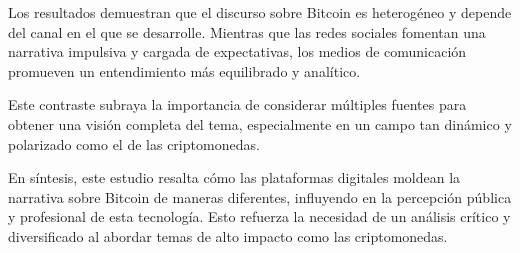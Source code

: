 \documentclass[journal]{IEEEtran}
\begin{document}
Los resultados demuestran que el discurso sobre Bitcoin es heterogéneo y depende del canal en el que se desarrolle. Mientras que las redes sociales fomentan una narrativa impulsiva y cargada de expectativas, los medios de comunicación promueven un entendimiento más equilibrado y analítico.

Este contraste subraya la importancia de considerar múltiples fuentes para obtener una visión completa del tema, especialmente en un campo tan dinámico y polarizado como el de las criptomonedas.

En síntesis, este estudio resalta cómo las plataformas digitales moldean la narrativa sobre Bitcoin de maneras diferentes, influyendo en la percepción pública y profesional de esta tecnología. Esto refuerza la necesidad de un análisis crítico y diversificado al abordar temas de alto impacto como las criptomonedas.


\ifCLASSOPTIONcaptionsoff
  \newpage
\fi





%
%
%

\end{document}
